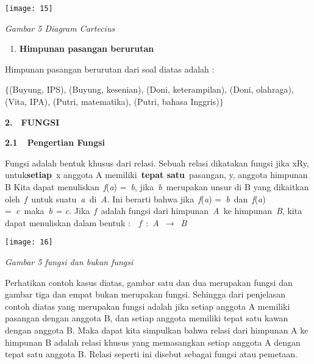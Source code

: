 \documentclass[11pt,fleqn]{book} %
\begin{document}
\begin{center}
\noindent \texttt{[image: 15]}
\end{center}

\noindent \textit{Gambar 5 Diagram Cartecius}

\noindent \textbf{}

\begin{enumerate}
\item \textbf{ Himpunan pasangan berurutan}
\end{enumerate}

\noindent Himpunan pasangan berurutan dari soal diatas adalah :

\noindent 

\noindent $\{$(Buyung, IPS), (Buyung, kesenian), (Doni, keterampilan), (Doni, olahraga), (Vita, IPA), (Putri, matematika), (Putri, bahasa Inggris)$\}$

\noindent 

\noindent 

\noindent \eject 

\noindent \textbf{2.}~~\textbf{FUNGSI}

\noindent \textbf{2.1~~Pengertian Fungsi}

\noindent \textbf{}

Fungsi adalah bentuk khusus dari relasi. Sebuah relasi dikatakan fungsi jika xRy, untuk\textbf{setiap}~x anggota A memiliki~\textbf{tepat satu}~pasangan, y, anggota himpunan B Kita dapat menuliskan~\textit{f}(\textit{a}) =~\textit{b}, jika~\textit{b~}merupakan unsur di B yang dikaitkan oleh~\textit{f~}untuk suatu~\textit{a~}di~\textit{A}. Ini berarti bahwa jika~\textit{f}(\textit{a}) =~\textit{b~}dan~\textit{f}(\textit{a}) =~\textit{c~}maka~\textit{b = c}. Jika~\textit{f~}adalah fungsi dari himpunan~\textit{A~}ke himpunan~\textit{B}, kita dapat menuliskan dalam bentuk :~~\textit{f~}:~\textit{A~}$\mathrm{\to}$~\textit{B}

\noindent 

\begin{center}
\noindent \texttt{[image: 16]}
\end{center}

\noindent \textit{Gambar 5 fungsi dan bukan fungsi}

\noindent 

\noindent Perhatikan contoh kasus diatas, gambar satu dan dua merupakan fungsi dan gambar tiga dan empat bukan merupakan fungsi. Sehingga dari penjelasan contoh diatas yang merupakan fungsi adalah jika setiap anggota A memiliki pasangan dengan anggota B, dan setiap anggota memiliki tepat satu kawan dengan anggota B. Maka dapat kita simpulkan bahwa relasi dari himpunan A ke himpunan B adalah relasi khusus yang memasangkan setiap anggota A dengan tepat satu anggota B. Relasi seperti ini disebut sebagai fungsi atau pemetaan.
\end{document}
